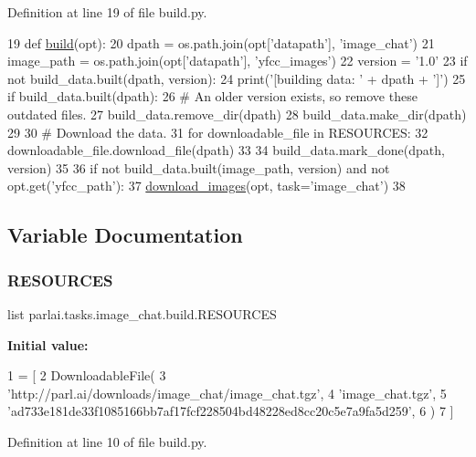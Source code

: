 Definition at line 19 of file build.\+py.


\begin{DoxyCode}
19 \textcolor{keyword}{def }\hyperlink{namespacedialog__babi__feedback_1_1build_a7a9d289f7493a5ded13c4b7f071b6184}{build}(opt):
20     dpath = os.path.join(opt[\textcolor{stringliteral}{'datapath'}], \textcolor{stringliteral}{'image\_chat'})
21     image\_path = os.path.join(opt[\textcolor{stringliteral}{'datapath'}], \textcolor{stringliteral}{'yfcc\_images'})
22     version = \textcolor{stringliteral}{'1.0'}
23     \textcolor{keywordflow}{if} \textcolor{keywordflow}{not} build\_data.built(dpath, version):
24         print(\textcolor{stringliteral}{'[building data: '} + dpath + \textcolor{stringliteral}{']'})
25         \textcolor{keywordflow}{if} build\_data.built(dpath):
26             \textcolor{comment}{# An older version exists, so remove these outdated files.}
27             build\_data.remove\_dir(dpath)
28         build\_data.make\_dir(dpath)
29 
30         \textcolor{comment}{# Download the data.}
31         \textcolor{keywordflow}{for} downloadable\_file \textcolor{keywordflow}{in} RESOURCES:
32             downloadable\_file.download\_file(dpath)
33 
34         build\_data.mark\_done(dpath, version)
35 
36     \textcolor{keywordflow}{if} \textcolor{keywordflow}{not} build\_data.built(image\_path, version) \textcolor{keywordflow}{and} \textcolor{keywordflow}{not} opt.get(\textcolor{stringliteral}{'yfcc\_path'}):
37         \hyperlink{namespaceparlai_1_1tasks_1_1personality__captions_1_1download__images_a9d812a095ca6d48541b3d5cdc65a4bf3}{download\_images}(opt, task=\textcolor{stringliteral}{'image\_chat'})
38 \end{DoxyCode}


\subsection{Variable Documentation}
\mbox{\label{namespaceparlai_1_1tasks_1_1image__chat_1_1build_a16b6341acb1502cb3bd80737372fd208}} 
\subsubsection{\texorpdfstring{R\+E\+S\+O\+U\+R\+C\+ES}{RESOURCES}}
{\footnotesize\ttfamily list parlai.\+tasks.\+image\+\_\+chat.\+build.\+R\+E\+S\+O\+U\+R\+C\+ES}

{\bfseries Initial value\+:}
\begin{DoxyCode}
1 =  [
2     DownloadableFile(
3         \textcolor{stringliteral}{'http://parl.ai/downloads/image\_chat/image\_chat.tgz'},
4         \textcolor{stringliteral}{'image\_chat.tgz'},
5         \textcolor{stringliteral}{'ad733e181de33f1085166bb7af17fcf228504bd48228ed8cc20c5e7a9fa5d259'},
6     )
7 ]
\end{DoxyCode}


Definition at line 10 of file build.\+py.

